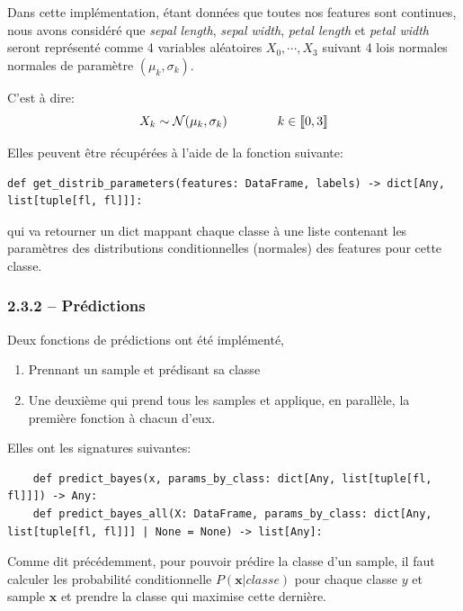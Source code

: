 \documentclass[
]{article}
\providecommand{\tightlist}{%
  \setlength{\itemsep}{0pt}\setlength{\parskip}{0pt}}
\begin{document}
Dans cette implémentation, étant données que toutes nos features sont
continues, nous avons considéré que \emph{sepal length}, \emph{sepal
width}, \emph{petal length} et \emph{petal width} seront représenté
comme 4 variables aléatoires \(X_0, \cdots, X_3\) suivant 4 lois
normales normales de paramètre \((\mu_k, \sigma_k)\).

C'est à dire: \[
X_k \sim \mathcal{N}( \mu_k, \sigma_k) \qquad \qquad k \in \llbracket{0, 3}\rrbracket
\]

Elles peuvent être récupérées à l'aide de la fonction suivante:

\begin{lstlisting}
def get_distrib_parameters(features: DataFrame, labels) -> dict[Any, list[tuple[fl, fl]]]:
\end{lstlisting}

qui va retourner un dict mappant chaque classe à une liste contenant les
paramètres des distributions conditionnelles (normales) des features
pour cette classe.

\hypertarget{pruxe9dictions-1}{%
\subsubsection{2.3.2 -- Prédictions}\label{pruxe9dictions-1}}

Deux fonctions de prédictions ont été implémenté,

\begin{enumerate}
\def\labelenumi{\arabic{enumi}.}
\tightlist
\item
  Prennant un sample et prédisant sa classe
\item
  Une deuxième qui prend tous les samples et applique, en parallèle, la
  première fonction à chacun d'eux.
\end{enumerate}

Elles ont les signatures suivantes:

\begin{lstlisting}
    def predict_bayes(x, params_by_class: dict[Any, list[tuple[fl, fl]]]) -> Any:
    def predict_bayes_all(X: DataFrame, params_by_class: dict[Any, list[tuple[fl, fl]]] | None = None) -> list[Any]:
\end{lstlisting}

Comme dit précédemment, pour pouvoir prédire la classe d'un sample, il
faut calculer les probabilité conditionnelle \(P(\mathbf{x}| classe)\)
pour chaque classe \(y\) et sample \(\mathbf{x}\) et prendre la classe
qui maximise cette dernière.
\end{document}
